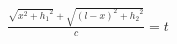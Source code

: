 \documentclass[preview]{standalone}
\begin{document}
\begin{align*}
\frac{\sqrt{x^2 + {h_1}^2} + \sqrt{(l-x)^2 + {h_2}^2}}{c} = t
\end{align*}
\end{document}

